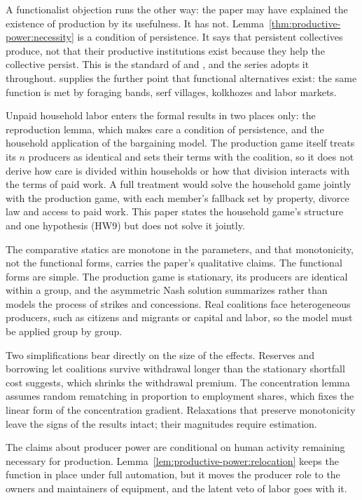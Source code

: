 \documentclass[11pt,letterpaper]{article}
\theoremstyle{definition}
\theoremstyle{remark}
\begin{document}
A functionalist objection runs the other way: the paper may have explained the existence of production by its usefulness. It has not. Lemma~\ref{thm:productive-power:necessity} is a condition of persistence. It says that persistent collectives produce, not that their productive institutions exist because they help the collective persist. This is the standard of \citet{hempel1959} and \citet{elster1983}, and the series adopts it throughout. \citet{merton1968} supplies the further point that functional alternatives exist: the same function is met by foraging bands, serf villages, kolkhozes and labor markets.

Unpaid household labor enters the formal results in two places only: the reproduction lemma, which makes care a condition of persistence, and the household application of the bargaining model. The production game itself treats its $n$ producers as identical and sets their terms with the coalition, so it does not derive how care is divided within households or how that division interacts with the terms of paid work. A full treatment would solve the household game jointly with the production game, with each member's fallback set by property, divorce law and access to paid work. This paper states the household game's structure and one hypothesis (HW9) but does not solve it jointly.

The comparative statics are monotone in the parameters, and that monotonicity, not the functional forms, carries the paper's qualitative claims. The functional forms are simple. The production game is stationary, its producers are identical within a group, and the asymmetric Nash solution summarizes rather than models the process of strikes and concessions. Real coalitions face heterogeneous producers, such as citizens and migrants or capital and labor, so the model must be applied group by group.

Two simplifications bear directly on the size of the effects. Reserves and borrowing let coalitions survive withdrawal longer than the stationary shortfall cost suggests, which shrinks the withdrawal premium. The concentration lemma assumes random rematching in proportion to employment shares, which fixes the linear form of the concentration gradient. Relaxations that preserve monotonicity leave the signs of the results intact; their magnitudes require estimation.

The claims about producer power are conditional on human activity remaining necessary for production. Lemma~\ref{lem:productive-power:relocation} keeps the function in place under full automation, but it moves the producer role to the owners and maintainers of equipment, and the latent veto of labor goes with it.
\end{document}
